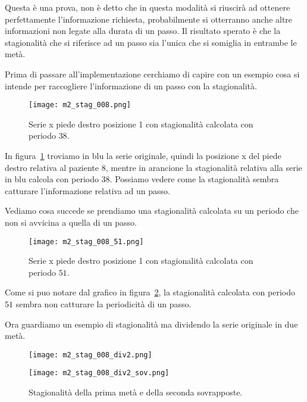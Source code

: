 Questa è una prova, non è detto che in questa modalità si riuscirà ad ottenere perfettamente l'informazione
richiesta, probabilmente si otterranno anche altre informazioni non legate alla durata di un passo.
Il risultato sperato è che la stagionalità che si riferisce ad un passo sia l'unica che si somiglia in 
entrambe le metà.

Prima di passare all'implementazione cerchiamo di capire con un esempio cosa si intende 
per raccogliere l'informazione di un passo con la stagionalità.

\begin{figure}[H]
    \centering
    \texttt{[image: m2\_stag\_008.png]}
    \caption{Serie x piede destro posizione 1 con stagionalità calcolata con periodo $38$.}
    \label{fig:m2_stag_008}
\end{figure}

In figura~\ref{fig:m2_stag_008} troviamo in blu la serie originale, quindi la posizione x del piede 
destro relativa al paziente $8$, mentre in arancione la stagionalità relativa alla serie 
in blu calcola con periodo $38$. Possiamo vedere come la stagionalità sembra catturare l'informazione
relativa ad un passo.

Vediamo cosa succede se prendiamo una stagionalità calcolata su un periodo che non si avvicina a 
quella di un passo.

\begin{figure}[H]
    \centering
    \texttt{[image: m2\_stag\_008\_51.png]}
    \caption{Serie x piede destro posizione 1 con stagionalità calcolata con periodo $51$.}
    \label{fig:m2_stag_008_51}
\end{figure}

Come si puo notare dal grafico in figura~\ref{fig:m2_stag_008_51}, la stagionalità calcolata con periodo $51$
sembra non catturare la periodicità di un passo.


Ora guardiamo un esempio di stagionalità ma dividendo la serie originale in due metà.
\begin{figure}[H]
    \centering
    \texttt{[image: m2\_stag\_008\_div2.png]}
    \caption{Serie x piede destro posizione 1 diviso in due + stagionalità calcolata con periodo $38$.}
    \label{fig:m2_stag_008_div2}

    \texttt{[image: m2\_stag\_008\_div2\_sov.png]}
    \caption{Stagionalità della prima metà e della seconda sovrapposte.}
    \label{fig:m2_stag_008_div2_sov}
\end{figure}

